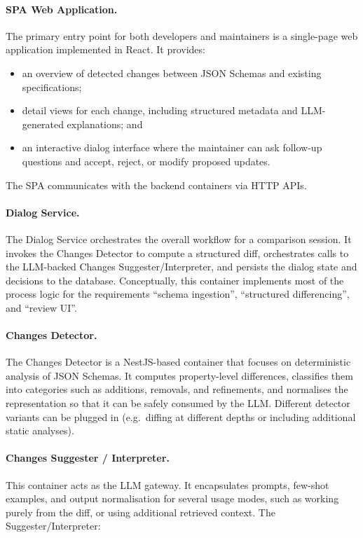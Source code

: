 \paragraph{SPA Web Application.}
The primary entry point for both developers and maintainers is a single-page
web application implemented in React. It provides:

\begin{itemize}
  \item an overview of detected changes between JSON Schemas and existing
  specifications;
  \item detail views for each change, including structured metadata and
  LLM-generated explanations; and
  \item an interactive dialog interface where the maintainer can ask follow-up
  questions and accept, reject, or modify proposed updates.
\end{itemize}

The SPA communicates with the backend containers via HTTP APIs.

\paragraph{Dialog Service.}
The Dialog Service orchestrates the overall workflow for a comparison session.
It invokes the Changes Detector to compute a structured diff, orchestrates
calls to the LLM-backed Changes Suggester/Interpreter, and persists the dialog
state and decisions to the database. Conceptually, this container implements
most of the process logic for the requirements ``schema ingestion'',
``structured differencing'', and ``review UI''.

\paragraph{Changes Detector.}
The Changes Detector is a NestJS-based container that focuses on deterministic
analysis of JSON Schemas. It computes property-level differences, classifies
them into categories such as additions, removals, and refinements, and
normalises the representation so that it can be safely consumed by the LLM.
Different detector variants can be plugged in (e.g.\ diffing at different
depths or including additional static analyses).

\paragraph{Changes Suggester / Interpreter.}
This container acts as the LLM gateway. It encapsulates prompts,
few-shot examples, and output normalisation for several usage modes, such as
working purely from the diff, or using additional retrieved context. The
Suggester/Interpreter:

